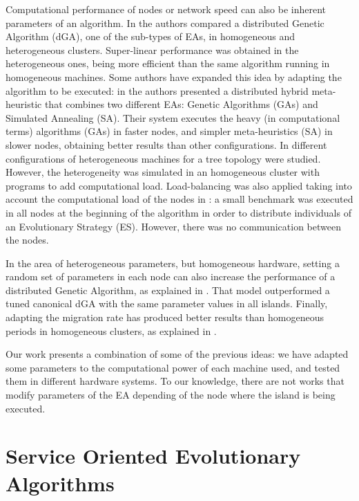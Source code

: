 \documentclass[final,1p,times]{elsarticle}
\begin{document}
 Computational performance of nodes or network speed can also be inherent parameters of an algorithm. In \cite{HETEROGENEOUSHARD} the authors compared a distributed Genetic Algorithm (dGA), one of the sub-types of EAs, in homogeneous and heterogeneous clusters. Super-linear performance was obtained in the heterogeneous ones, being more efficient than the same algorithm running in homogeneous machines. Some authors have expanded this idea by adapting the algorithm to be executed: in \cite{HYDROCM} the authors presented a distributed hybrid meta-heuristic that combines two different EAs: Genetic Algorithms (GAs) and Simulated Annealing (SA). Their system executes the heavy (in computational terms) algorithms (GAs) in faster nodes, and simpler meta-heuristics (SA) in slower nodes, obtaining better results than other configurations. In \cite{HETEROGENEOUSTOPOLOGY} different configurations of heterogeneous machines for a tree topology were studied. However, the heterogeneity was simulated in an homogeneous cluster with programs to add computational load. Load-balancing was also applied taking into account the computational load of the nodes in \cite{PARALLELIMPLEMENTATION}: a small benchmark was executed in all nodes at the beginning of the algorithm in order to distribute individuals of an Evolutionary Strategy (ES). However, there was no communication between the nodes. 

In the area of heterogeneous parameters, but homogeneous hardware, setting a random set of parameters in each node can also increase the performance of a distributed Genetic Algorithm, as explained in \cite{HETEROGENEOUSPARAMETERS}. That model outperformed a tuned canonical dGA with the same parameter values in all islands. Finally, adapting the migration rate has produced better results than homogeneous periods in homogeneous clusters, as explained in \cite{HETEROGENEOUSMIGRATION}.

 Our work presents a combination of some of the previous ideas: we have adapted some parameters to the computational power of each machine used, and tested them in different hardware systems.
 To our knowledge, there are not works that
 modify parameters of the EA depending of the
 node where the island is being executed. 



\section{Service Oriented Evolutionary Algorithms}
\label{sec:soaea}
\end{document}
